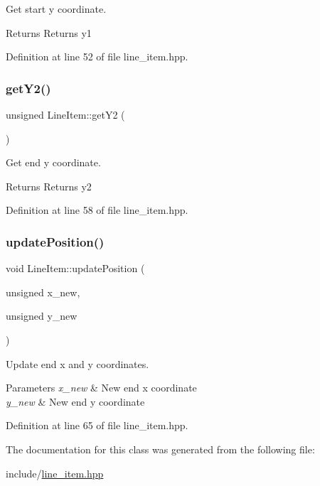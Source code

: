 Get start y coordinate. 

\begin{DoxyReturn}{Returns}
Returns y1 
\end{DoxyReturn}


Definition at line 52 of file line\+\_\+item.\+hpp.

\mbox{\label{classLineItem_aa99afab282d1e7e25b5d1549a41984d2}} 
\subsubsection{\texorpdfstring{get\+Y2()}{getY2()}}
{\footnotesize\ttfamily unsigned Line\+Item\+::get\+Y2 (\begin{DoxyParamCaption}{ }\end{DoxyParamCaption})\hspace{0.3cm}{\ttfamily [inline]}}



Get end y coordinate. 

\begin{DoxyReturn}{Returns}
Returns y2 
\end{DoxyReturn}


Definition at line 58 of file line\+\_\+item.\+hpp.

\mbox{\label{classLineItem_acea090c7b9ff53dcc7a95ab7939b2cb9}} 
\subsubsection{\texorpdfstring{update\+Position()}{updatePosition()}}
{\footnotesize\ttfamily void Line\+Item\+::update\+Position (\begin{DoxyParamCaption}\item[{unsigned}]{x\+\_\+new,  }\item[{unsigned}]{y\+\_\+new }\end{DoxyParamCaption})\hspace{0.3cm}{\ttfamily [inline]}}



Update end x and y coordinates. 


\begin{DoxyParams}{Parameters}
{\em x\+\_\+new} & New end x coordinate \\
\hline
{\em y\+\_\+new} & New end y coordinate \\
\hline
\end{DoxyParams}


Definition at line 65 of file line\+\_\+item.\+hpp.



The documentation for this class was generated from the following file\+:\begin{DoxyCompactItemize}
\item 
include/\mbox{\hyperlink{line__item_8hpp}{line\+\_\+item.\+hpp}}\end{DoxyCompactItemize}
